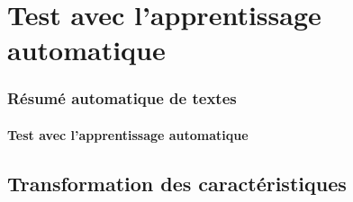 \documentclass[xcolor=table]{beamer}
\begin{document}
\section{Test avec l'apprentissage automatique} 

\begin{frame}
	\frametitle{Résumé automatique de textes}
	\framesubtitle{Test avec l'apprentissage automatique}
	
	\begin{center}
	\end{center}
	
\end{frame}

\subsection{Transformation des caractéristiques}
\end{document}

